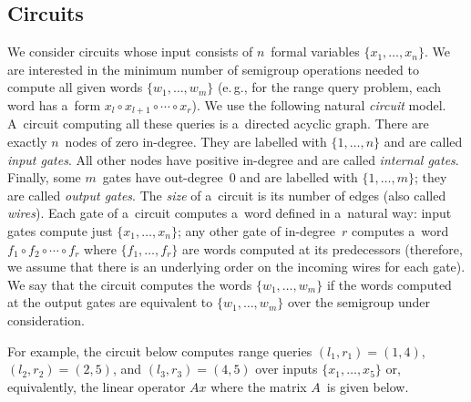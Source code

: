 \documentclass[11pt]{article}
\numberwithin{equation}{section}
\theoremstyle{definition}
\theoremstyle{plain}
\newcommand{\eg}{e.\,g.}
\theoremstyle{plain}\newtheorem{observation}[theorem]{Observation}
\begin{document}
\subsection{Circuits}\label{subsec:circuits}
We consider circuits whose input consists of $n$~formal variables
$\{x_1, \dotsc, x_n\}$. We are interested in the minimum number of semigroup
operations needed to compute all given words $\{w_1, \dotsc, w_m\}$ (\eg, for
%
%
the range query problem,
each word has a~form $x_l\circ x_{l+1}\circ \dotsb \circ x_r$).
We use
the following natural \emph{circuit} model. A~circuit computing all these queries
is a~directed acyclic graph. There are exactly $n$~nodes of zero in-degree. They
are labelled with $\{1, \dotsc, n\}$ and are called \emph{input gates}. All
other nodes have positive in-degree and are called
%
%
\emph{internal gates}.
%
%
Finally, some
$m$~gates have out-degree~0 and are labelled with $\{1, \dotsc, m\}$; they are
called \emph{output gates}.
The
\emph{size} of a~circuit is its number of edges (also called \emph{wires}). Each
gate of a~circuit computes a~word defined in a~natural way: input gates compute
just $\{x_1, \dotsc, x_n\}$; any other gate of in-degree~$r$ computes a~word
$f_1 \circ f_2 \circ \dotsb \circ f_r$ where $\{f_1, \dotsc, f_r\}$ are words
computed at its predecessors (therefore, we assume that there is an underlying
order on the incoming wires for each gate). We say that the circuit computes the
words $\{w_1, \dotsc, w_m\}$ if the words computed at the output gates are
equivalent to $\{w_1, \dotsc, w_m\}$ over the %
semigroup under consideration.  %

For example, the circuit below computes range queries
$(l_1,r_1)=(1,4)$,
$(l_2,r_2)=(2,5)$, and
$(l_3,r_3)=(4,5)$
over inputs $\{x_1, \dotsc, x_5\}$ or, equivalently, the
linear operator $Ax$ where the matrix $A$~is given below.

\vspace{5mm}
\begin{center}
\end{center}
\vspace{5mm}
\end{document}

